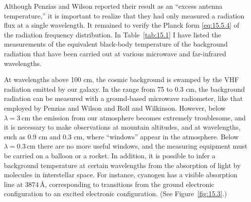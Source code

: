 Although Penzias and Wilson reported their result as an ``excess antenna
temperature,'' it is important to realize that they had only measured a
radiation flux at a single wavelength. It remained to verify the Planck form
\eqref{eq:15.5.4} of the radiation frequency distribution. In
Table~\ref{tab:15.1} I have listed the measurements of the equivalent
black-body temperature of the background radiation that have been carried out
at various microwave and far-infrared wavelengths.

At wavelengths above 100 cm, the cosmic background is swamped by the VHF
radiation emitted by our galaxy. In the range from 75 to 0.3 cm, the background
radiation can be measured with a ground-based microwave radiometer, like that
employed by Penzias and Wilson and Roll and Wilkinson. However, below
\(\lambda=3\,\mathrm{cm}\) the emission from our atmosphere becomes extremely
troublesome, and it is necessary to make observations at mountain altitudes,
and at wavelengths, such as 0.9 cm and 0.3 cm, where ``windows'' appear in the
atmosphere. Below \(\lambda=0.3\,\mathrm{cm}\) there are no more useful
windows, and the measuring equipment must be carried on a balloon or a rocket.
In addition, it is possible to infer a background temperature at certain
wavelengths from the absorption of light by molecules in interstellar space.
For instance, cyanogen has a visible absorption line at
\(3874\,\text{\AA}\), corresponding to transitions from the ground electronic
configuration to an excited electronic configuration. (See
Figure~\ref{fig:15.3}.)

